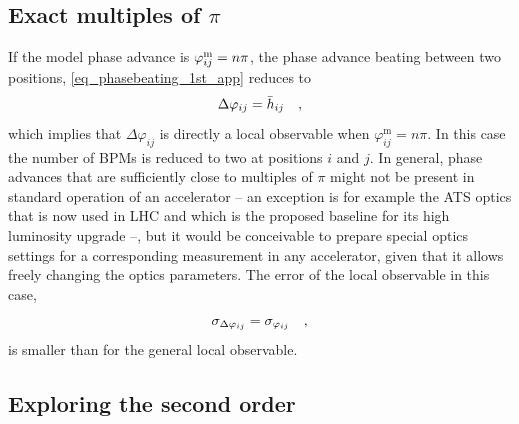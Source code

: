 \subsection{Exact multiples of \texorpdfstring{$\pi$}{pi}}

If the model phase advance is $\varphi_{ij}^\text{m} = n\pi$, the phase advance beating between two positions,
\eqref{eq_phasebeating_1st_app} reduces to
%
\begin{equation}
  \Delta\varphi_{ij} = \bar{h}_{ij}
  \quad ,
  \label{eq_npi_localobs}
\end{equation}
%
which implies that $\Delta \varphi_{ij}$ is directly a local observable when
$\varphi_{ij}^\text{m}=n\pi$.
In this case the number of BPMs is reduced to two at positions $i$ and
$j$.
In general, phase advances that are sufficiently close to multiples of $\pi$ might not be present in
standard operation of an accelerator -- an exception is for example the ATS optics
\cite{Fartoukh2013} that is now used
in LHC and which is the proposed baseline for its high luminosity upgrade --, but it would be conceivable to prepare
special optics settings for a corresponding measurement in any accelerator, given that it allows freely changing the optics parameters.
The error of the local observable in this case,
%
\begin{equation}
    \sigma_{\Delta\varphi_{ij}} = \sigma_{\varphi_{ij}}
    \quad ,
    \label{eq_error_npi}
\end{equation}
%
is smaller than for the general local observable.

\subsection{Exploring the second order}
\label{ssec:second_order_phasebeating}

